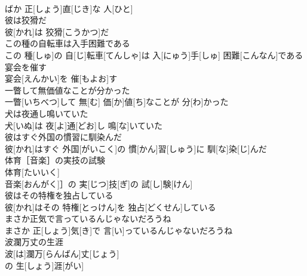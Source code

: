 \documentclass[8pt]{extreport}
\begin{document}
\begin{CJK}{UTF8}{min}
\\	ばか 正[しょう]直[じき]な 人[ひと]
\\	彼は狡猾だ	
\\	彼[かれ]は 狡猾[こうかつ]だ
\\	この種の自転車は入手困難である	
\\	この 種[しゅ]の 自[じ]転車[てんしゃ]は 入[にゅう]手[しゅ] 困難[こんなん]である
\\	宴会を催す	
\\	宴会[えんかい]を 催[もよお]す
\\	一瞥して無価値なことが分かった	
\\	一瞥[いちべつ]して 無[む] 価[か]値[ち]なことが 分[わ]かった
\\	犬は夜通し鳴いていた	
\\	犬[いぬ]は 夜[よ]通[どお]し 鳴[な]いていた
\\	彼はすぐ外国の慣習に馴染んだ	
\\	彼[かれ]はすぐ 外国[がいこく]の 慣[かん]習[しゅう]に 馴[な]染[じ]んだ
\\	体育［音楽］の実技の試験	
\\	体育[たいいく]
\\	音楽[おんがく]］の 実[じつ]技[ぎ]の 試[し]験[けん]
\\	彼はその特権を独占している	
\\	彼[かれ]はその 特権[とっけん]を 独占[どくせん]している
\\	まさか正気で言っているんじゃないだろうね	
\\	まさか 正[しょう]気[き]で 言[い]っているんじゃないだろうね
\\	波瀾万丈の生涯	
\\	波[は]瀾万[らんばん]丈[じょう]
\\	の 生[しょう]涯[がい]
\end{CJK}
\end{document}
